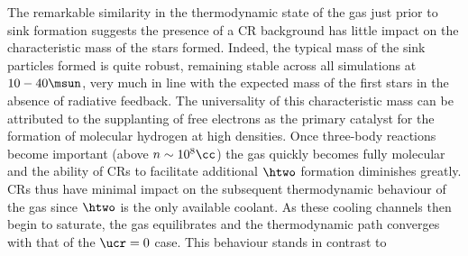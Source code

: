 The remarkable similarity in the thermodynamic state of the gas just prior to sink formation suggests the presence of a CR background has little impact on the characteristic mass of the stars formed.  
Indeed, the typical mass of the sink particles formed is quite robust, remaining stable across all simulations at $10-40\msun$, very much in line with the expected mass of the first stars in the absence of radiative feedback. 
The universality of this characteristic mass can be attributed to the supplanting of free electrons as the primary catalyst for the formation of molecular hydrogen at high densities.  
Once three-body reactions become important (above $n\sim10^8\cc$) the gas quickly becomes fully molecular and the ability of CRs to facilitate additional $\htwo$ formation diminishes greatly. 
CRs thus have minimal impact on the subsequent thermodynamic behaviour of the gas since $\htwo$ is the only available coolant. 
As these cooling channels then begin to saturate, the gas equilibrates and the thermodynamic path converges with that of the $\ucr=0$ case.
This behaviour stands in contrast to 


